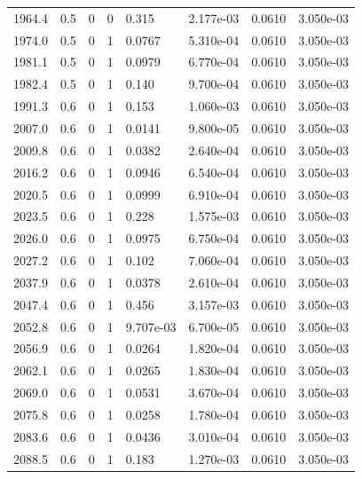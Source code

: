 \documentclass[preview]{standalone}
\begin{document}
{{{{{{{{{\begin{tabular}{L{1.2cm}C{1.2cm} C{0.3cm}C{0.5cm} C{1.4cm}C{1.4cm} C{1.4cm}C{1.4cm}}
  1964.4  &   0.5  & 0     &  0 &  0.315  & 2.177e-03  & 0.0610 &  3.050e-03   \\ 
  1974.0  &   0.5  & 0     &  1 &  0.0767  & 5.310e-04  & 0.0610 &  3.050e-03   \\ 
  1981.1  &   0.5  & 0     &  1 &  0.0979  & 6.770e-04  & 0.0610 &  3.050e-03   \\ 
  1982.4  &   0.5  & 0     &  1 &  0.140  & 9.700e-04  & 0.0610 &  3.050e-03   \\ 
  1991.3  &   0.6  & 0     &  1 &  0.153  & 1.060e-03  & 0.0610 &  3.050e-03   \\ 
  2007.0  &   0.6  & 0     &  1 &  0.0141  & 9.800e-05  & 0.0610 &  3.050e-03   \\ 
  2009.8  &   0.6  & 0     &  1 &  0.0382  & 2.640e-04  & 0.0610 &  3.050e-03   \\ 
  2016.2  &   0.6  & 0     &  1 &  0.0946  & 6.540e-04  & 0.0610 &  3.050e-03   \\ 
  2020.5  &   0.6  & 0     &  1 &  0.0999  & 6.910e-04  & 0.0610 &  3.050e-03   \\ 
  2023.5  &   0.6  & 0     &  1 &  0.228  & 1.575e-03  & 0.0610 &  3.050e-03   \\ 
  2026.0  &   0.6  & 0     &  1 &  0.0975  & 6.750e-04  & 0.0610 &  3.050e-03   \\ 
  2027.2  &   0.6  & 0     &  1 &  0.102  & 7.060e-04  & 0.0610 &  3.050e-03   \\ 
  2037.9  &   0.6  & 0     &  1 &  0.0378  & 2.610e-04  & 0.0610 &  3.050e-03   \\ 
  2047.4  &   0.6  & 0     &  1 &  0.456  & 3.157e-03  & 0.0610 &  3.050e-03   \\ 
  2052.8  &   0.6  & 0     &  1 &  9.707e-03  & 6.700e-05  & 0.0610 &  3.050e-03   \\ 
  2056.9  &   0.6  & 0     &  1 &  0.0264  & 1.820e-04  & 0.0610 &  3.050e-03   \\ 
  2062.1  &   0.6  & 0     &  1 &  0.0265  & 1.830e-04  & 0.0610 &  3.050e-03   \\ 
  2069.0  &   0.6  & 0     &  1 &  0.0531  & 3.670e-04  & 0.0610 &  3.050e-03   \\ 
  2075.8  &   0.6  & 0     &  1 &  0.0258  & 1.780e-04  & 0.0610 &  3.050e-03   \\ 
  2083.6  &   0.6  & 0     &  1 &  0.0436  & 3.010e-04  & 0.0610 &  3.050e-03   \\ 
  2088.5  &   0.6  & 0     &  1 &  0.183  & 1.270e-03  & 0.0610 &  3.050e-03   \\ 

\end{tabular}}}}}}}}}}
\end{document}
